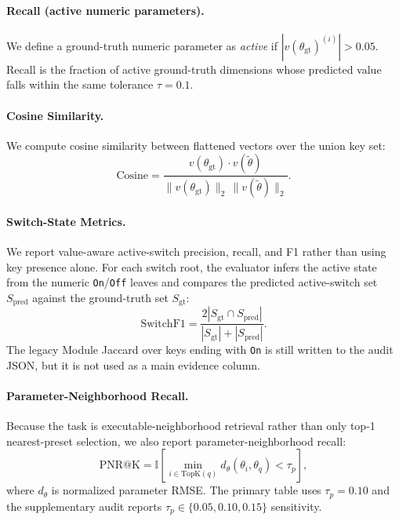 \paragraph{Recall (active numeric parameters).}
We define a ground-truth numeric parameter as \emph{active} if $\left|v(\theta_{\text{gt}})^{(i)}\right|>0.05$. Recall is the fraction of active ground-truth dimensions whose predicted value falls within the same tolerance $\tau=0.1$.

\paragraph{Cosine Similarity.}
We compute cosine similarity between flattened vectors over the union key set:
\begin{equation}
		\text{Cosine} = \frac{v(\theta_{\text{gt}})\cdot v(\tilde{\theta})}{\|v(\theta_{\text{gt}})\|_2\,\|v(\tilde{\theta})\|_2}.
\end{equation}

\paragraph{Switch-State Metrics.}
We report value-aware active-switch precision, recall, and F1 rather than using key presence alone. For each switch root, the evaluator infers the active state from the numeric \texttt{On}/\texttt{Off} leaves and compares the predicted active-switch set $S_{\text{pred}}$ against the ground-truth set $S_{\text{gt}}$:
\begin{equation}
	\text{SwitchF1} = \frac{2|S_{\text{gt}}\cap S_{\text{pred}}|}{|S_{\text{gt}}|+|S_{\text{pred}}|}.
\end{equation}
The legacy Module Jaccard over keys ending with \texttt{On} is still written to the audit JSON, but it is not used as a main evidence column.

\paragraph{Parameter-Neighborhood Recall.}
Because the task is executable-neighborhood retrieval rather than only top-1 nearest-preset selection, we also report parameter-neighborhood recall:
\begin{equation}
	\mathrm{PNR@K}=
	\mathbb{I}\left[\min_{i\in\mathrm{TopK}(q)}d_\theta(\theta_i,\theta_q)<\tau_p\right],
\end{equation}
where $d_\theta$ is normalized parameter RMSE. The primary table uses $\tau_p=0.10$ and the supplementary audit reports $\tau_p\in\{0.05,0.10,0.15\}$ sensitivity.


